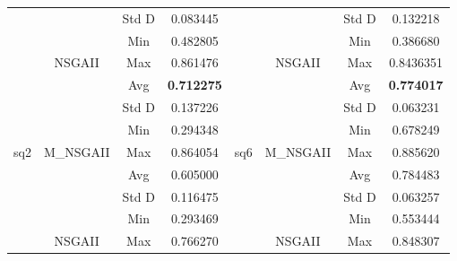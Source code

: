 \begin{table}[]
\begin{tabular}{cccccccc}
		&                             & Std D      & 0.083445          &                       &                                                     & Std D      & 0.132218          \\ \cline{3-4} \cline{7-8} 
		&                             & Min        & 0.482805          &                       &                                                     & Min        & 0.386680          \\ \cline{3-4} \cline{7-8} 
		& \multirow{-4}{*}{NSGAII}    & Max        & 0.861476          &                       & \multirow{-4}{*}{NSGAII}                            & Max        & 0.8436351          \\ \cline{2-4} \cline{6-8} 
		&                             & Avg        & \textbf{0.712275} &                       & \cellcolor[HTML]{C0C0C0}                            & Avg        & \textbf{0.774017} \\ \cline{3-4} \cline{7-8} 
		&                             & Std D      & 0.137226          &                       & \cellcolor[HTML]{C0C0C0}                            & Std D      & 0.063231          \\ \cline{3-4} \cline{7-8} 
		&                             & Min        & 0.294348          &                       & \cellcolor[HTML]{C0C0C0}                            & Min        & 0.678249          \\ \cline{3-4} \cline{7-8} 
		\multirow{-8}{*}{sq2} & \multirow{-4}{*}{M\_NSGAII} & Max        & 0.864054          & \multirow{-8}{*}{sq6} & \multirow{-4}{*}{\cellcolor[HTML]{C0C0C0}M\_NSGAII} & Max        & 0.885620          \\ \hline
		&                             & Avg        & 0.605000          &                       &                                                     & Avg        & 0.784483          \\ \cline{3-4} \cline{7-8} 
		&                             & Std D      & 0.116475          &                       &                                                     & Std D      & 0.063257          \\ \cline{3-4} \cline{7-8} 
		&                             & Min        & 0.293469          &                       &                                                     & Min        & 0.553444          \\ \cline{3-4} \cline{7-8} 
		& \multirow{-4}{*}{NSGAII}    & Max        & 0.766270          &                       & \multirow{-4}{*}{NSGAII}                            & Max        & 0.848307          \\ \cline{2-4} \cline{6-8} 

\end{tabular}
\end{table}
